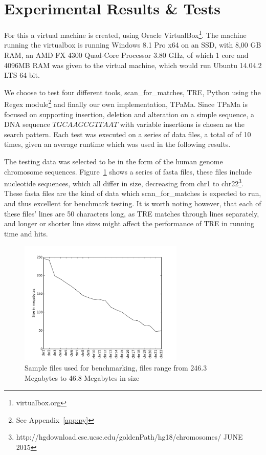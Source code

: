 \section{Experimental Results \& Tests}
For this a virtual machine is created, using Oracle VirtualBox\footnote{virtualbox.org}. The machine running the virtualbox is running Windows 8.1 Pro x64 on an SSD, with 8,00 GB RAM, an AMD FX 4300 Quad-Core Processor 3.80 GHz, of which 1 core and 4096MB RAM was given to the virtual machine, which would run Ubuntu 14.04.2 LTS 64 bit.

We choose to test four different tools, scan\_for\_matches, TRE, Python using the Regex module\footnote{See Appendix~\ref{app:py}} and finally our own implementation, TPaMa. Since TPaMa is focused on supporting insertion, deletion and alteration on a simple sequence, a DNA sequence $TGCAAGCGTTAAT$ with variable insertions is chosen as the search pattern. Each test was executed on a series of data files, a total of of 10 times, given an average runtime which was used in the following results.


The testing data was selected to be in the form of the human genome chromosome sequences. Figure~\ref{fig:size} shows a series of fasta files, these files include nucleotide sequences, which all differ in size, decreasing from chr1 to chr22\footnote{http://hgdownload.cse.ucsc.edu/goldenPath/hg18/chromosomes/ JUNE 2015}. These fasta files are the kind of data which scan\_for\_matches is expected to run, and thus excellent for benchmark testing. It is worth noting however, that each of these files' lines are 50 characters long, as TRE matches through lines separately, and longer or shorter line sizes might affect the performance of TRE in running time and hits.%
\begin{figure}[h!]
\centering
\includegraphics[width=0.7\textwidth]{Benchmarking/size.png}
\caption{Sample files used for benchmarking, files range from 246.3 Megabytes to 46.8 Megabytes in size}
\label{fig:size}
\end{figure}

